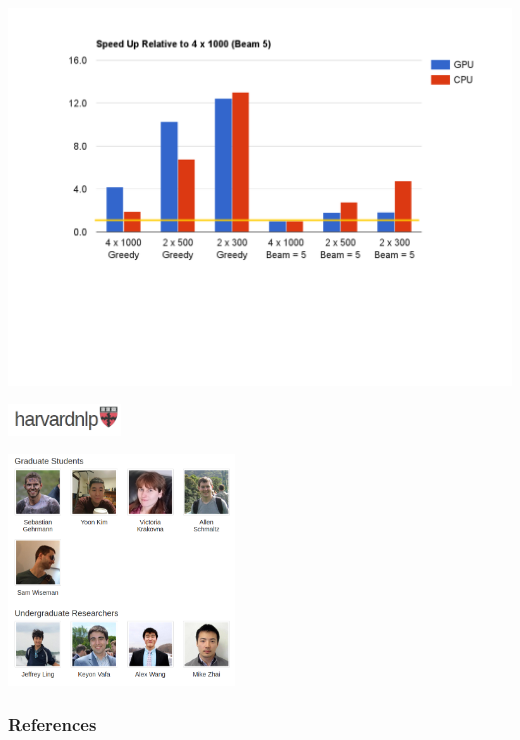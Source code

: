 \documentclass{beamer}
\newcommand{\air}{\vspace{0.25cm}}
\begin{document}
\begin{frame}
\centerline{}
\center
\vspace{-5mm}
\includegraphics[scale=0.44]{dec-speed.pdf}
\end{frame}

\begin{frame}
  \begin{center} 
  \end{center}
  \air 
  \begin{center}
    \includegraphics[width=3cm]{harvardnlp}
  \end{center}

  \begin{center}
    \includegraphics[width=6cm]{harvardnlpgroup}
  \end{center}
  
\end{frame}



\begin{frame}[t,allowframebreaks]
  \frametitle{References}
  \begin{small}
    
  \end{small}
 \end{frame}


\end{document}

